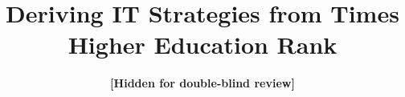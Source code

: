 \documentclass[conference]{IEEEtran}
\begin{document}
%

\title{Deriving IT Strategies from Times Higher Education Rank}
 \author{\textbf{[Hidden for double-blind review]}}
\end{document}
